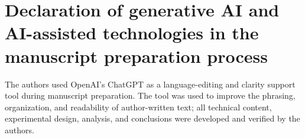 \documentclass[preprint,12pt,authoryear]{elsarticle}
\begin{document}
\section*{Declaration of generative AI and AI-assisted technologies in the manuscript preparation process}
The authors used OpenAI's ChatGPT as a language-editing and clarity support tool during manuscript preparation.
The tool was used to improve the phrasing, organization, and readability of author-written text; all technical content, experimental design, analysis, and conclusions were developed and verified by the authors.




\end{document}
